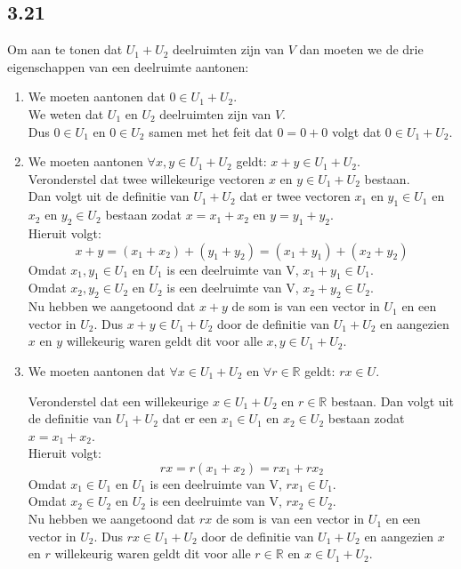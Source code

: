 \documentclass[lineaire_algebra_oplossingen.tex]{subfiles}
\begin{document}
\subsection{3.21}
Om aan te tonen dat $U_1 + U_2$ deelruimten zijn van $V$ dan moeten we de drie eigenschappen van een deelruimte aantonen:
\begin{enumerate}
\item We moeten aantonen dat $0 \in U_1 + U_2$.\\
We weten dat $U_1$ en $U_2$ deelruimten zijn van $V$.\\
Dus $0 \in U_1$ en $0 \in U_2$ samen met het feit dat $0 = 0 + 0$ volgt dat $0 \in U_1 + U_2$.

\item We moeten aantonen $\forall x,y \in U_1 + U_2$ geldt: $x + y \in U_1 + U_2$.\\
Veronderstel dat twee willekeurige vectoren $x$ en $y \in U_1 + U_2$ bestaan.\\
Dan volgt uit de definitie van $U_1 + U_2$ dat er twee vectoren $x_1$ en $y_1 \in U_1$ en $x_2$ en $y_2 \in U_2$ bestaan zodat $x = x_1 + x_2$ en $y = y_1 + y_2$.\\
Hieruit volgt:
$$x + y = (x_1 + x_2) + (y_1 + y_2) = (x_1 + y_1) + (x_2 + y_2)$$
Omdat $x_1, y_1 \in U_1$ en $U_1$ is een deelruimte van V, $x_1 + y_1 \in U_1$.\\
Omdat $x_2, y_2 \in U_2$ en $U_2$ is een deelruimte van V, $x_2 + y_2 \in U_2$.\\
Nu hebben we aangetoond dat $x+y$ de som is van een vector in $U_1$ en een vector in $U_2$. 
Dus $x + y \in U_1 + U_2$ door de definitie van $U_1 + U_2$ en aangezien $x$ en $y$ willekeurig waren geldt dit voor alle $x,y \in U_1 + U_2$.

\item We moeten aantonen dat $\forall x \in U_1 + U_2$ en $\forall r \in \mathbb{R}$ geldt: $rx \in U$.

Veronderstel dat een willekeurige $x \in U_1 + U_2$ en $r \in \mathbb{R}$ bestaan. Dan volgt uit de definitie van $U_1 + U_2$ dat er een $x_1 \in U_1$ en $x_2 \in U_2$ bestaan zodat $x = x_1 + x_2$.\\
Hieruit volgt:
$$rx = r(x_1+x_2) = rx_1+rx_2$$
Omdat $x_1 \in U_1$ en $U_1$ is een deelruimte van V, $rx_1 \in U_1$.\\
Omdat $x_2 \in U_2$ en $U_2$ is een deelruimte van V, $rx_2 \in U_2$.\\
Nu hebben we aangetoond dat $rx$ de som is van een vector in $U_1$ en een vector in $U_2$. 
Dus $rx \in U_1 + U_2$ door de definitie van $U_1 + U_2$ en aangezien $x$ en $r$ willekeurig waren geldt dit voor alle $r \in \mathbb{R}$ en $x \in U_1 + U_2$.
\end{enumerate}
\end{document}
